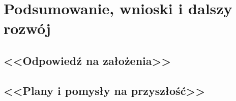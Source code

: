 \newpage

\section{Podsumowanie, wnioski i dalszy rozwój}

\paragraph{}

\par

\subsection{<<Odpowiedź na założenia>>}

\paragraph{}

\par

\subsection{<<Plany i pomysły na przyszłość>>}

\paragraph{}

\par
